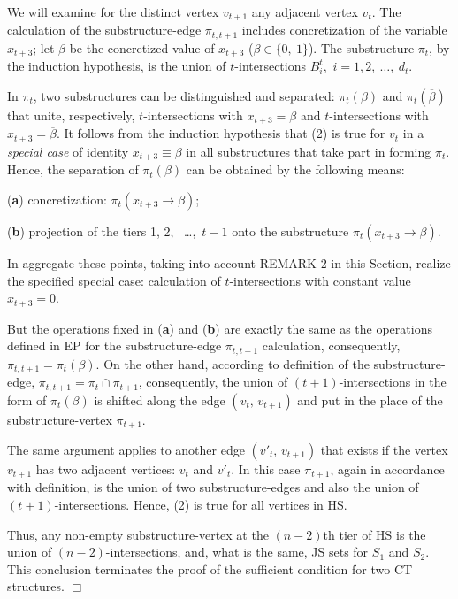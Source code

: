 \documentclass[12pt, a4paper]{article}
\begin{document}
We will examine for the distinct vertex $v_{t+1}$ any adjacent vertex $v_t$. The calculation of the substructure-edge $\pi_{t,t+1}$   includes concretization of the variable $x_{t+3}$; let $\beta$ be the concretized value of $x_{t+3}$ ($\beta \in \{0,\ 1\}$). The substructure $\pi_t$, by the induction hypothesis, is the union of $t$-intersections $B_i^t$,\,  $i=1, 2, \ \dots,\ d_t$.

In $\pi_t$, two substructures can be distinguished and separated: $\pi_t(\beta)$ and $\pi_t(\overline{\beta})$ that unite, respectively, $t$-intersections with $x_{t+3}=\beta$ and $t$-intersections with  $x_{t+3}=\overline{\beta}$. It follows from the induction hypothesis that (2) is true for $v_t$ in a {\it special case} of identity $x_{t+3}\equiv \beta$ in all substructures that take part in forming  $\pi_t$. Hence, the separation of $\pi_t(\beta)$ can be obtained by the following means:

({\bf a}) concretization:  $\pi_t(x_{t+3}\to \beta)$;

({\bf b}) projection of the tiers 1, 2, \ \dots ,\  $t-1$ onto the substructure $\pi_t(x_{t+3}\to \beta)$.

In aggregate these points, taking into account REMARK 2 in this Section, realize the specified special case: calculation of  $t$-intersections with constant value $x_{t+3} = 0$.

But the operations fixed in ({\bf a}) and ({\bf b}) are exactly the same as the operations defined in EP for the substructure-edge $\pi_{t,t+1}$ calculation, consequently,  $\pi_{t,t+1}=\pi_t(\beta)$. On the other hand, according to definition of the substructure-edge,  $\pi_{t,t+1}=\pi_t\cap \pi_{t+1}$, consequently, the union of $(t+1)$-intersections in the form of $\pi_t(\beta)$ is shifted along the edge $(v_t,\,v_{t+1})$ and put in the place of the substructure-vertex  $\pi_{t+1}$.

The same argument applies to another edge $(v'_t,\,v_{t+1})$ that exists if the vertex $v_{t+1}$ has two adjacent vertices: $v_t$  and  $v'_t$. In this case $\pi_{t+1}$, again in accordance with definition, is the union of two substructure-edges and also the union of  $(t+1)$-intersections. Hence, (2) is true for all vertices in HS.

Thus, any non-empty substructure-vertex at the $(n-2)$th tier of HS is the union of $(n-2)$-intersections, and, what is the same, JS sets for $S_1$ and $S_2$. This conclusion terminates the proof of the sufficient condition for two CT structures. $\Box$
\end{document}
